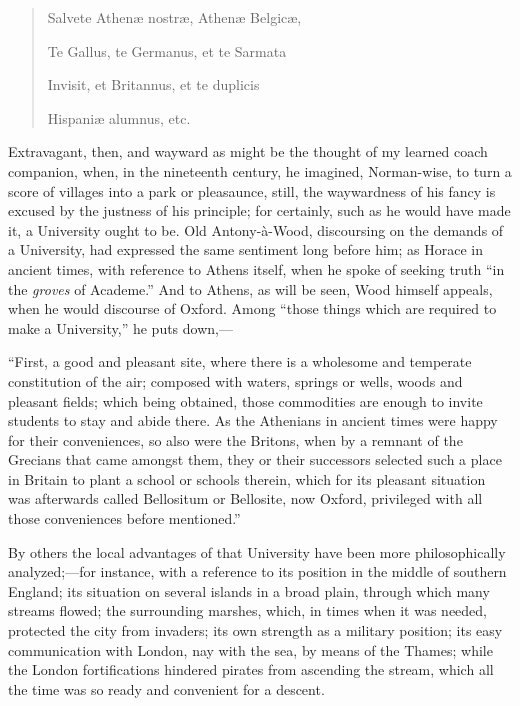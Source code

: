 \begin{quote}

Salvete Athenæ nostræ, Athenæ Belgicæ,

Te Gallus, te Germanus, et te Sarmata

Invisit, et Britannus, et te duplicis

Hispaniæ alumnus, etc.

\end{quote}

Extravagant, then, and wayward as might be the thought of my
learned coach companion, when, in the nineteenth century, he imagined,
Norman-wise, to turn a score of villages into a park or pleasaunce,
still, the waywardness of his fancy is excused by the justness of his
principle; for certainly, such as he would have made it, a University
ought to be. Old Antony-à-Wood, discoursing on the demands of a
University, had expressed the same sentiment long before him; as
Horace in ancient times, with reference to Athens itself, when he
spoke of seeking truth ``in the \emph{groves} of Academe.''
And to Athens, as will be seen, Wood himself appeals, when he would
discourse of Oxford. Among ``those things which are required to
make a University,'' he puts down,—

``First, a good and pleasant site, where there is a wholesome
and temperate constitution of the air; composed with waters, springs
or wells, woods and pleasant fields; which being obtained, those
commodities are enough to invite students to stay and abide there. As
the Athenians in ancient times were happy for their conveniences, so
also were the Britons, when by a remnant of the Grecians that came
amongst them, they or their successors selected such a place in
Britain to plant a school or schools therein, which for its pleasant
situation was afterwards called Bellositum or Bellosite, now Oxford,
privileged with all those conveniences before mentioned.''

By others the local advantages of that University have been more
philosophically analyzed;—for instance, with a reference to its
position in the middle of southern England; its situation on several
islands in a broad plain, through which many streams flowed; the
surrounding marshes, which, in times when it was needed, protected the
city from invaders; its own strength as a military position; its easy
communication with London, nay with the sea, by means of the Thames;
while the London fortifications hindered pirates from ascending the
stream, which all the time was so ready and convenient for a descent.


